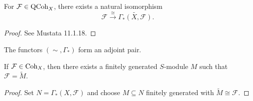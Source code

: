 \begin{prop}
  For $\mathcal{F} \in \operatorname{QCoh}_X$,
  there exists a natural isomorphism
  \[
    \mathcal{F}
    \overset{\cong}{\longrightarrow}
    \widetilde{\Gamma_*(X, \mathcal{F})}.
  \]
\end{prop}

\begin{proof}
  See Mustata 11.1.18.
\end{proof}

\begin{remark}
  The functors
  $(\sim, \Gamma_*)$
  form an adjoint pair.
\end{remark}

\begin{corollary}
  If $\mathcal{F} \in \operatorname{Coh}_X$, then
  there exists a finitely generated
  $S$-module $M$ such that
  $\mathcal{F} = \widetilde{M}$.
\end{corollary}

\begin{proof}
  Set $N = \Gamma_*(X, \mathcal{F})$
  and choose $M \subseteq N$ finitely generated
  with $\widetilde{M} \cong \mathcal{F}$.
\end{proof}
